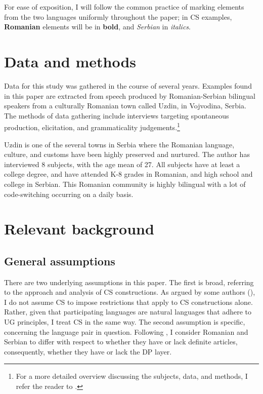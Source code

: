 \documentclass[output=paper,hidelinks,newtxmath,]{langscibook}
\begin{document}
For ease of exposition, I will follow the common practice of marking elements from the two languages uniformly throughout the paper; in CS examples, \textbf{Romanian} elements will be in \textbf{bold}, and \textit{Serbian} in \textit{italics}.

\section{Data and methods}\label{15:s2}

Data for this study was gathered in the course of several years. Examples found in this paper are extracted from speech produced by Romanian-Serbian bilingual speakers from a culturally Romanian town called Uzdin, in Vojvodina, Serbia. The methods of data gathering include interviews targeting spontaneous production, elicitation, and grammaticality judgements.\footnote{For a more detailed overview discussing the subjects, data, and methods, I refer the reader to \citet{Petroj}.} 

Uzdin is one of the several towns in Serbia where the Romanian language, culture, and customs have been highly preserved and nurtured. The author has interviewed 8 subjects, with the age mean of 27. All subjects have at least a college degree, and have attended K-8 grades in Romanian, and high school and college in Serbian. This Romanian community is highly bilingual with a lot of code-switching occurring on a daily basis.

\section{Relevant background}\label{15:s3}
\subsection{General assumptions}\label{15:s3.1}

There are two underlying assumptions in this paper. The first is broad, referring to the approach and analysis of CS constructions. As argued by some authors (\citealt{GonzalesVelasquez1995,Bhatia-Ritchie1996,denDikken2011,BandiRao-denDikken2014}), I do not assume CS to impose restrictions that apply to CS constructions alone. Rather, given that participating languages are natural languages that adhere to UG principles, I treat CS in the same way. The second assumption is specific, concerning the language pair in question. Following \citet{Boskovic2008,Boskovic2012}, I consider Romanian and Serbian to differ with respect to whether they have or lack definite articles, consequently, whether they have or lack the DP layer.
\end{document}
